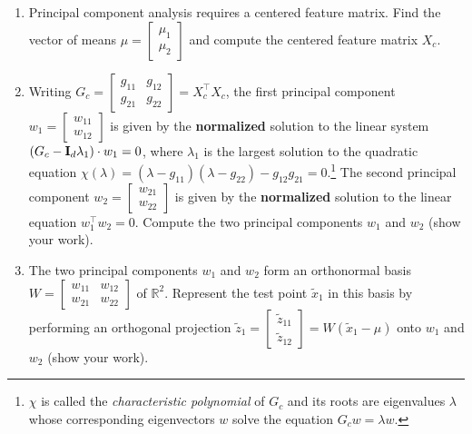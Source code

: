 \documentclass{article}
\def\blu#1{{\color{blu}#1}}
\begin{document}
\medskip

\begin{enumerate}
  \item Principal component analysis requires a centered feature matrix. \blu{Find the vector of means $\mu=\begin{bmatrix} \mu_1 \\ \mu_2 \end{bmatrix}$ and compute the centered feature matrix $X_c$.}
  \item Writing $G_c= \begin{bmatrix} g_{11} & g_{12}\\ g_{21} & g_{22} \end{bmatrix} = X_c^\top X_c$, the first principal component $w_1=\begin{bmatrix}w_{11} \\ w_{12}\end{bmatrix}$ is given by the {\bf normalized} solution to the linear system $(G_c-{\bf I}_d\lambda_1)\cdot w_1 = 0$, where $\lambda_1$ is the largest solution to the quadratic equation $\chi(\lambda)=(\lambda-g_{11})(\lambda-g_{22})-g_{12}g_{21}=0$.\footnote{$\chi$ is called the \emph{characteristic polynomial} of $G_c$ and its roots are eigenvalues $\lambda$ whose corresponding eigenvectors $w$ solve the equation $G_cw = \lambda w$.} The second principal component $w_2=\begin{bmatrix}w_{21} \\ w_{22}\end{bmatrix}$ is given by the {\bf normalized} solution to the linear equation $w_1^\top w_2 = 0$. \blu{Compute the two principal components $w_1$ and $w_2$ (show your work).}
  \item The two principal components $w_1$ and $w_2$ form an orthonormal basis $W = \begin{bmatrix}w_{11} & w_{12}\\w_{21} & w_{22}\end{bmatrix}$ of $\mathbb{R}^2$. \blu{Represent the test point $\tilde{x}_1$ in this basis by performing an orthogonal projection $\tilde{z}_1 = \begin{bmatrix} \tilde{z}_{11} \\ \tilde{z}_{12} \end{bmatrix} = W(\tilde{x}_1-\mu)$ onto $w_1$ and $w_2$ (show your work).}

  \pagebreak


\end{enumerate}
\end{document}
